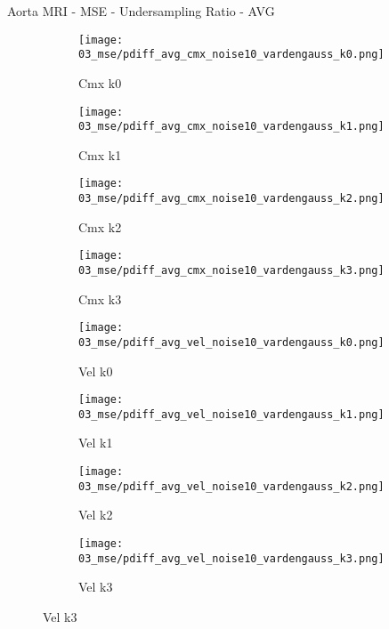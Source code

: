 \documentclass{beamer}
\begin{document}
\begin{frame}{Aorta MRI - MSE - Undersampling Ratio - AVG}{}
\begin{figure}
\begin{subfigure}{0.24\textwidth}
\texttt{[image: 03\_mse/pdiff\_avg\_cmx\_noise10\_vardengauss\_k0.png]}
\vspace{-20pt}
\caption*{\tiny Cmx k0}
\end{subfigure}
\begin{subfigure}{0.24\textwidth}
\texttt{[image: 03\_mse/pdiff\_avg\_cmx\_noise10\_vardengauss\_k1.png]}
\vspace{-20pt}
\caption*{\tiny Cmx k1}
\end{subfigure}
\begin{subfigure}{0.24\textwidth}
\texttt{[image: 03\_mse/pdiff\_avg\_cmx\_noise10\_vardengauss\_k2.png]}
\vspace{-20pt}
\caption*{\tiny Cmx k2}
\end{subfigure}
\begin{subfigure}{0.24\textwidth}
\texttt{[image: 03\_mse/pdiff\_avg\_cmx\_noise10\_vardengauss\_k3.png]}
\vspace{-20pt}
\caption*{\tiny Cmx k3}
\end{subfigure}

\begin{subfigure}{0.24\textwidth}
\texttt{[image: 03\_mse/pdiff\_avg\_vel\_noise10\_vardengauss\_k0.png]}
\vspace{-20pt}
\caption*{\tiny Vel k0}
\end{subfigure}
\begin{subfigure}{0.24\textwidth}
\texttt{[image: 03\_mse/pdiff\_avg\_vel\_noise10\_vardengauss\_k1.png]}
\vspace{-20pt}
\caption*{\tiny Vel k1}
\end{subfigure}
\begin{subfigure}{0.24\textwidth}
\texttt{[image: 03\_mse/pdiff\_avg\_vel\_noise10\_vardengauss\_k2.png]}
\vspace{-20pt}
\caption*{\tiny Vel k2}
\end{subfigure}
\begin{subfigure}{0.24\textwidth}
\texttt{[image: 03\_mse/pdiff\_avg\_vel\_noise10\_vardengauss\_k3.png]}
\vspace{-20pt}
\caption*{\tiny Vel k3}
\end{subfigure}
\end{figure}
\end{frame}
\end{document}
